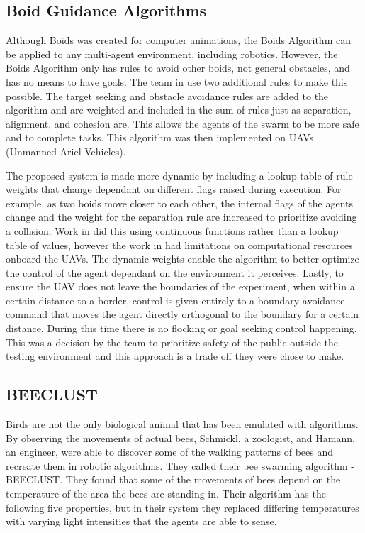 \subsection{Boid Guidance Algorithms}

Although Boids was created for computer animations, the Boids Algorithm can be applied to any multi-agent environment, including robotics. However, the Boids Algorithm only has rules to avoid other boids, not general obstacles, and has no means to have goals. The team in \cite{clark2012flight} use two additional rules to make this possible. The target seeking and obstacle avoidance rules are added to the algorithm and are weighted and included in the sum of rules just as separation, alignment, and cohesion are. This allows the agents of the swarm to be more safe and to complete tasks. This algorithm was then implemented on UAVs (Unmanned Ariel Vehicles).

The proposed system is made more dynamic by including a lookup table of rule weights that change dependant on different flags raised during execution. For example, as two boids move closer to each other, the internal flags of the agents change and the weight for the separation rule are increased to prioritize avoiding a collision. Work in \cite{crowther2004rule} did this using continuous functions rather than a lookup table of values, however the work in \cite{clark2012flight} had limitations on computational resources onboard the UAVs. The dynamic weights enable the algorithm to better optimize the control of the agent dependant on the environment it perceives. Lastly, to ensure the UAV does not leave the boundaries of the experiment, when within a certain distance to a border, control is given entirely to a boundary avoidance command that moves the agent directly orthogonal to the boundary for a certain distance. During this time there is no flocking or goal seeking control happening. This was a decision by the team to prioritize safety of the public outside the testing environment and this approach is a trade off they were chose to make.

\subsection{BEECLUST}

Birds are not the only biological animal that has been emulated with algorithms. By observing the movements of actual bees, Schmickl, a zoologist, and Hamann, an engineer, \cite{schmickl2011beeclust} were able to discover some of the walking patterns of bees and recreate them in robotic algorithms. They called their bee swarming algorithm -  BEECLUST. They found that some of the movements of bees depend on the temperature of the area the bees are standing in. Their algorithm has the following five properties, but in their system they replaced differing temperatures with varying light intensities that the agents are able to sense.

